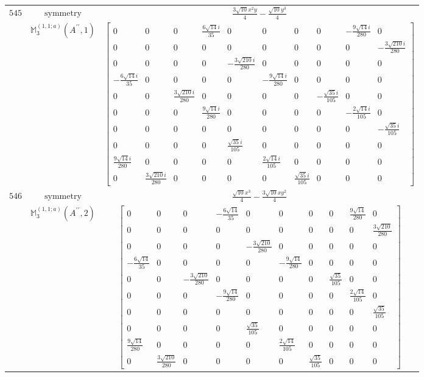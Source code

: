 \documentclass[fleqn,8pt,landscape]{jsarticle}
\begin{document}
\begin{longtable}{ccc}
$ 545 $ & $ \text{symmetry} $ & $ \frac{3 \sqrt{10} x^{2} y}{4} - \frac{\sqrt{10} y^{3}}{4} $ \\
$  $ & $ \mathbb{M}_{3}^{(1,1;a)}(A^{\prime\prime},1) $ & $ \begin{bmatrix} 0 & 0 & 0 & \frac{6 \sqrt{14} i}{35} & 0 & 0 & 0 & 0 & - \frac{9 \sqrt{14} i}{280} & 0 \\ 0 & 0 & 0 & 0 & 0 & 0 & 0 & 0 & 0 & - \frac{3 \sqrt{210} i}{280} \\ 0 & 0 & 0 & 0 & - \frac{3 \sqrt{210} i}{280} & 0 & 0 & 0 & 0 & 0 \\ - \frac{6 \sqrt{14} i}{35} & 0 & 0 & 0 & 0 & - \frac{9 \sqrt{14} i}{280} & 0 & 0 & 0 & 0 \\ 0 & 0 & \frac{3 \sqrt{210} i}{280} & 0 & 0 & 0 & 0 & - \frac{\sqrt{35} i}{105} & 0 & 0 \\ 0 & 0 & 0 & \frac{9 \sqrt{14} i}{280} & 0 & 0 & 0 & 0 & - \frac{2 \sqrt{14} i}{105} & 0 \\ 0 & 0 & 0 & 0 & 0 & 0 & 0 & 0 & 0 & - \frac{\sqrt{35} i}{105} \\ 0 & 0 & 0 & 0 & \frac{\sqrt{35} i}{105} & 0 & 0 & 0 & 0 & 0 \\ \frac{9 \sqrt{14} i}{280} & 0 & 0 & 0 & 0 & \frac{2 \sqrt{14} i}{105} & 0 & 0 & 0 & 0 \\ 0 & \frac{3 \sqrt{210} i}{280} & 0 & 0 & 0 & 0 & \frac{\sqrt{35} i}{105} & 0 & 0 & 0 \end{bmatrix} $ \\ \hline
$ 546 $ & $ \text{symmetry} $ & $ \frac{\sqrt{10} x^{3}}{4} - \frac{3 \sqrt{10} x y^{2}}{4} $ \\
$  $ & $ \mathbb{M}_{3}^{(1,1;a)}(A^{\prime\prime},2) $ & $ \begin{bmatrix} 0 & 0 & 0 & - \frac{6 \sqrt{14}}{35} & 0 & 0 & 0 & 0 & \frac{9 \sqrt{14}}{280} & 0 \\ 0 & 0 & 0 & 0 & 0 & 0 & 0 & 0 & 0 & \frac{3 \sqrt{210}}{280} \\ 0 & 0 & 0 & 0 & - \frac{3 \sqrt{210}}{280} & 0 & 0 & 0 & 0 & 0 \\ - \frac{6 \sqrt{14}}{35} & 0 & 0 & 0 & 0 & - \frac{9 \sqrt{14}}{280} & 0 & 0 & 0 & 0 \\ 0 & 0 & - \frac{3 \sqrt{210}}{280} & 0 & 0 & 0 & 0 & \frac{\sqrt{35}}{105} & 0 & 0 \\ 0 & 0 & 0 & - \frac{9 \sqrt{14}}{280} & 0 & 0 & 0 & 0 & \frac{2 \sqrt{14}}{105} & 0 \\ 0 & 0 & 0 & 0 & 0 & 0 & 0 & 0 & 0 & \frac{\sqrt{35}}{105} \\ 0 & 0 & 0 & 0 & \frac{\sqrt{35}}{105} & 0 & 0 & 0 & 0 & 0 \\ \frac{9 \sqrt{14}}{280} & 0 & 0 & 0 & 0 & \frac{2 \sqrt{14}}{105} & 0 & 0 & 0 & 0 \\ 0 & \frac{3 \sqrt{210}}{280} & 0 & 0 & 0 & 0 & \frac{\sqrt{35}}{105} & 0 & 0 & 0 \end{bmatrix} $ \\ \hline

\end{longtable}
\end{document}
